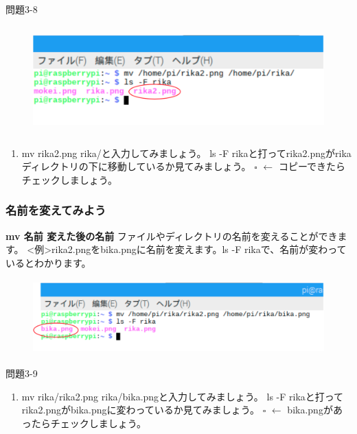 \documentclass[a4paper,dvipdfmx]{jarticle}
\begin{document}
{\ttfamily
問題3-8}

\begin{figure}
\centering
\includegraphics[width=11.719cm,height=4.17cm]{text03-img/text03-img018.png}
\end{figure}
\begin{enumerate}
\item mv rika2.png rika/と入力してみましょう。\newline
ls {}-F
rikaと打ってrika2.pngがrikaディレクトリの下に移動しているか見てみましょう。\newline
${\square}$ $\leftarrow $
コピーできたらチェックしましょう。\newline

\end{enumerate}
\subsubsection{名前を変えてみよう}
\textbf{mv 名前 変えた後の名前}\newline
ファイルやディレクトリの名前を変えることができます。\newline
{\textless}例{\textgreater}rika2.pngをbika.pngに名前を変えます。ls
{}-F
rikaで、名前が変わっているとわかります。

\begin{figure}
\centering
\includegraphics[width=13.279cm,height=2.882cm]{text03-img/text03-img019.png}
\end{figure}
{\ttfamily
問題3-9}

\begin{enumerate}
\item mv rika/rika2.png
rika/bika.pngと入力してみましょう。\newline
ls {}-F
rikaと打ってrika2.pngがbika.pngに変わっているか見てみましょう。\newline
${\square}$ $\leftarrow $
bika.pngがあったらチェックしましょう。
\end{enumerate}
\end{document}
